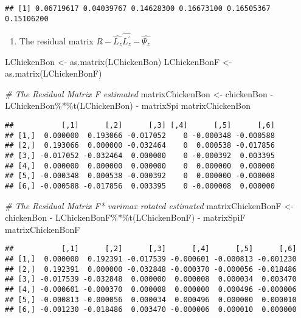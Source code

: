 \documentclass[
]{article}
\newenvironment{Shaded}{\begin{snugshade}}{\end{snugshade}}
\newcommand{\CommentTok}[1]{\textcolor[rgb]{0.56,0.35,0.01}{\textit{#1}}}
\newcommand{\FunctionTok}[1]{\textcolor[rgb]{0.00,0.00,0.00}{#1}}
\newcommand{\NormalTok}[1]{#1}
\newcommand{\OtherTok}[1]{\textcolor[rgb]{0.56,0.35,0.01}{#1}}
\newcommand{\SpecialCharTok}[1]{\textcolor[rgb]{0.00,0.00,0.00}{#1}}
\providecommand{\tightlist}{%
  \setlength{\itemsep}{0pt}\setlength{\parskip}{0pt}}
\begin{document}
\begin{verbatim}
## [1] 0.06719617 0.04039767 0.14628300 0.16673100 0.16505367 0.15106200
\end{verbatim}

\begin{enumerate}
\def\labelenumi{(\alph{enumi})}
\setcounter{enumi}{3}
\tightlist
\item
  The residual matrix
  \(R - \hat{L_{z}}\hat{L^{'}_{z}} - \hat{\Psi_{z}}\)
\end{enumerate}

\begin{Shaded}
\begin{Highlighting}[]
\NormalTok{LChickenBon }\OtherTok{\textless{}{-}} \FunctionTok{as.matrix}\NormalTok{(LChickenBon)}
\NormalTok{LChickenBonF }\OtherTok{\textless{}{-}} \FunctionTok{as.matrix}\NormalTok{(LChickenBonF)}

\CommentTok{\# The Residual Matrix F estimated}
\NormalTok{matrixChickenBon }\OtherTok{\textless{}{-}}\NormalTok{ chickenBon }\SpecialCharTok{{-}}\NormalTok{ LChickenBon}\SpecialCharTok{\%*\%}\FunctionTok{t}\NormalTok{(LChickenBon) }\SpecialCharTok{{-}}\NormalTok{ matrixSpi}
\NormalTok{matrixChickenBon}
\end{Highlighting}
\end{Shaded}

\begin{verbatim}
##           [,1]      [,2]      [,3] [,4]      [,5]      [,6]
## [1,]  0.000000  0.193066 -0.017052    0 -0.000348 -0.000588
## [2,]  0.193066  0.000000 -0.032464    0  0.000538 -0.017856
## [3,] -0.017052 -0.032464  0.000000    0 -0.000392  0.003395
## [4,]  0.000000  0.000000  0.000000    0  0.000000  0.000000
## [5,] -0.000348  0.000538 -0.000392    0  0.000000 -0.000008
## [6,] -0.000588 -0.017856  0.003395    0 -0.000008  0.000000
\end{verbatim}

\begin{Shaded}
\begin{Highlighting}[]
\CommentTok{\# The Residual Matrix F* varimax rotated estimated}
\NormalTok{matrixChickenBonF }\OtherTok{\textless{}{-}}\NormalTok{ chickenBon }\SpecialCharTok{{-}}\NormalTok{ LChickenBonF}\SpecialCharTok{\%*\%}\FunctionTok{t}\NormalTok{(LChickenBonF) }\SpecialCharTok{{-}}\NormalTok{ matrixSpiF}
\NormalTok{matrixChickenBonF}
\end{Highlighting}
\end{Shaded}

\begin{verbatim}
##           [,1]      [,2]      [,3]      [,4]      [,5]      [,6]
## [1,]  0.000000  0.192391 -0.017539 -0.000601 -0.000813 -0.001230
## [2,]  0.192391  0.000000 -0.032848 -0.000370 -0.000056 -0.018486
## [3,] -0.017539 -0.032848  0.000000  0.000008  0.000034  0.003470
## [4,] -0.000601 -0.000370  0.000008  0.000000  0.000496 -0.000006
## [5,] -0.000813 -0.000056  0.000034  0.000496  0.000000  0.000010
## [6,] -0.001230 -0.018486  0.003470 -0.000006  0.000010  0.000000
\end{verbatim}
\end{document}
